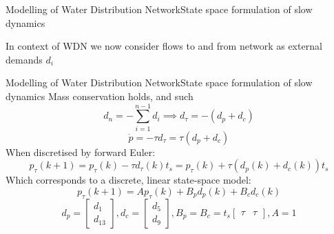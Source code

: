\begin{frame}{Modelling of Water Distribution Network}{State space formulation of slow dynamics}
	\begin{figure}[h!]
		\centering
		\resizebox{\columnwidth}{!}{
			}
		\label{fig:tikzWDNGraph}
	\end{figure}  
	In context of WDN we now consider flows to and from network as external demands $ d_i $
\end{frame}

\begin{frame}{Modelling of Water Distribution Network}{State space formulation of slow dynamics}
	Mass conservation holds, and such
	\begin{equation*}
		d_n = -\sum_{i=1}^{n-1}d_i \implies d_\tau = - (d_p + d_c)
	\end{equation*}
	\begin{equation*}
		\dot{p} = -\tau d_\tau = \tau (d_p + d_c)
	\end{equation*}	
	When discretised by forward Euler:
	\begin{equation*}
		p_\tau(k+1) = p_\tau(k) - \tau d_\tau(k) t_s = p_\tau(k) + \tau(d_p(k) + d_c(k)) t_s
	\end{equation*}
	Which corresponds to a discrete, linear state-space model:
	\begin{equation}
		p_\tau(k+1) = Ap_\tau(k) + B_pd_p(k) + B_cd_c(k)
	\end{equation}
	\begin{equation*}
		d_p = \begin{bmatrix}
			d_1 \\ d_{13}
		\end{bmatrix},
		d_c = \begin{bmatrix}
			d_5 \\ d_9
		\end{bmatrix},
		B_p = B_c = t_s  \begin{bmatrix}
			\tau & \tau
		\end{bmatrix},
		A = 1
	\end{equation*}
\end{frame}


